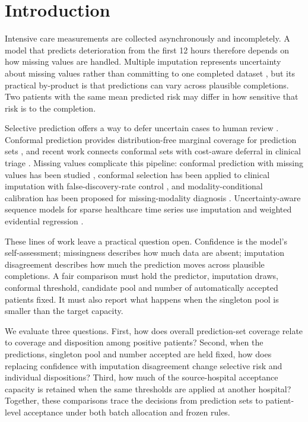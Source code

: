 
\section{Introduction}

Intensive care measurements are collected asynchronously and incompletely. A model that predicts deterioration from the first 12 hours therefore depends on how missing values are handled. Multiple imputation represents uncertainty about missing values rather than committing to one completed dataset \cite{rubin1987multiple,vanbuuren2011mice}, but its practical by-product is that predictions can vary across plausible completions. Two patients with the same mean predicted risk may differ in how sensitive that risk is to the completion.

Selective prediction offers a way to defer uncertain cases to human review \cite{chow1970optimum,geifman2017selective,mozannar2020consistent}. Conformal prediction provides distribution-free marginal coverage for prediction sets \cite{angelopoulos2023conformal}, and recent work connects conformal sets with cost-aware deferral in clinical triage \cite{kwon2026conformal}. Missing values complicate this pipeline: conformal prediction with missing values has been studied \cite{zaffran2023conformal}, conformal selection has been applied to clinical imputation with false-discovery-rate control \cite{he2026safeimpute}, and modality-conditional calibration has been proposed for missing-modality diagnosis \cite{wong2026mc2}. Uncertainty-aware sequence models for sparse healthcare time series use imputation and weighted evidential regression \cite{vavaroutas2025squiredl}.

These lines of work leave a practical question open. Confidence is the model's self-assessment; missingness describes how much data are absent; imputation disagreement describes how much the prediction moves across plausible completions. A fair comparison must hold the predictor, imputation draws, conformal threshold, candidate pool and number of automatically accepted patients fixed. It must also report what happens when the singleton pool is smaller than the target capacity.

We evaluate three questions. First, how does overall prediction-set coverage relate to coverage and disposition among positive patients? Second, when the predictions, singleton pool and number accepted are held fixed, how does replacing confidence with imputation disagreement change selective risk and individual dispositions? Third, how much of the source-hospital acceptance capacity is retained when the same thresholds are applied at another hospital? Together, these comparisons trace the decisions from prediction sets to patient-level acceptance under both batch allocation and frozen rules.

